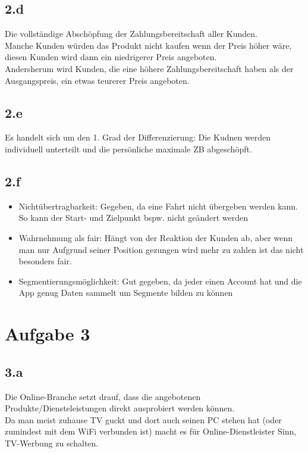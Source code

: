 \subsection{2.d}
    Die vollständige Abschöpfung der Zahlungsbereitschaft aller Kunden. \\
    Manche Kunden würden das Produkt nicht kaufen wenn der Preis höher wäre, diesen Kunden wird dann ein niedrigerer Preis angeboten. \\
    Andersherum wird Kunden, die eine höhere Zahlungsbereitschaft haben als der Ausgangspreis, ein etwas teurerer Preis angeboten.

\subsection{2.e}
    Es handelt sich um den 1. Grad der Differenzierung: Die Kudnen werden individuell unterteilt und die persönliche maximale ZB abgeschöpft.

\subsection{2.f}
    \begin{itemize}
        \item Nichtübertragbarkeit: Gegeben, da eine Fahrt nicht übergeben werden kann. So kann der Start- und Zielpunkt bspw. nicht geändert werden
        \item Wahrnehmung als fair: Hängt von der Reaktion der Kunden ab, aber wenn man nur Aufgrund seiner Position gezungen wird mehr zu zahlen ist das nicht besonders fair.
        \item Segmentierungsmöglichkeit: Gut gegeben, da jeder einen Account hat und die App genug Daten sammelt um Segmente bilden zu können
    \end{itemize}



\section{Aufgabe 3}
\subsection{3.a}
    Die Online-Branche setzt drauf, dass die angebotenen Produkte/Diensteleistungen direkt ausprobiert werden können. \\
    Da man meist zuhause TV guckt und dort auch seinen PC stehen hat (oder zumindest mit dem WiFi verbunden ist) macht es für Online-Dienstleister Sinn,
    TV-Werbung zu schalten.

